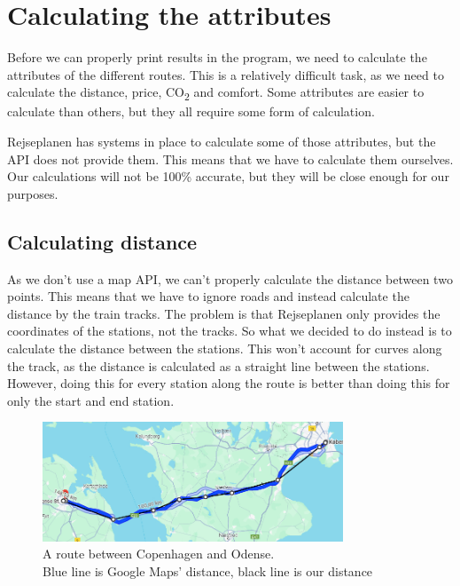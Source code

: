 \section{Calculating the attributes}

Before we can properly print results in the program, we need to calculate the attributes of the different routes.
This is a relatively difficult task, as we need to calculate the distance, price, \unit{CO_{2}} and comfort.
Some attributes are easier to calculate than others, but they all require some form of calculation.

Rejseplanen has systems in place to calculate some of those attributes, but the API does not provide them.
This means that we have to calculate them ourselves.
Our calculations will not be 100\% accurate, but they will be close enough for our purposes.

\subsection{Calculating distance}

As we don't use a map API, we can't properly calculate the distance between two points.
This means that we have to ignore roads and instead calculate the distance by the train tracks.
The problem is that Rejseplanen only provides the coordinates of the stations, not the tracks.
So what we decided to do instead is to calculate the distance between the stations.
This won't account for curves along the track, as the distance is calculated as a straight line between the stations.
However, doing this for every station along the route is better than doing this for only the start and end station.

\begin{figure}[H]
    \centering
    \includegraphics[width=0.8\textwidth]{images/google-maps-distance-calculation.jpg}
    \caption{A route between Copenhagen and Odense. \\ Blue line is Google Maps' distance, black line is our distance}
\end{figure}

